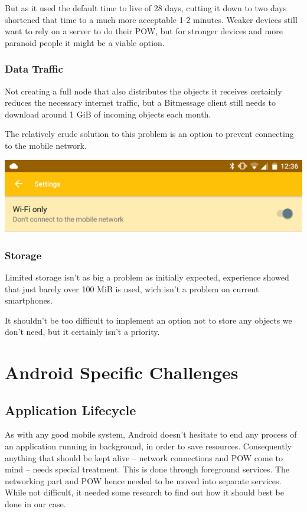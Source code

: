 \documentclass{bfh}
\begin{document}
  But as it used the default time to live of 28 days, cutting it down to two days shortened that time to a much more acceptable 1-2 minutes. Weaker devices still want to rely on a server to do their \ac{POW}, but for stronger devices and more paranoid people it might be a viable option.

  \subsubsection{Data Traffic}
  Not creating a full node that also distributes the objects it receives certainly reduces the necessary internet traffic, but a Bitmessage client still needs to download around 1 GiB of incoming objects each month.

  The relatively crude solution to this problem is an option to prevent connecting to the mobile network.

  \begin{center}
    \includegraphics[width=0.8 \textwidth]{images/screenshot_wifi_only_setting.png}
  \end{center}

  \subsubsection{Storage}
  Limited storage isn't as big a problem as initially expected, experience showed that just barely over 100 MiB is used, wich isn't a problem on current smartphones.

  It shouldn't be too difficult to implement an option not to store any objects we don't need, but it certainly isn't a priority.


  \newpage
  \section{Android Specific Challenges}
  \subsection{Application Lifecycle}
  As with any good mobile system, Android doesn't hesitate to end any process of an application running in background, in order to save resources. Consequently anything that should be kept alive -- network connections and \ac{POW} come to mind -- needs special treatment. This is done through foreground services. The networking part and \ac{POW} hence needed to be moved into separate services. While not difficult, it needed some research to find out how it should best be done in our case.
\end{document}
